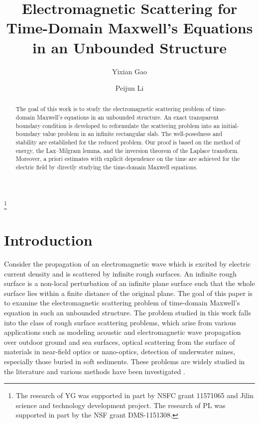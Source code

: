 \documentclass[11pt,reqno]{amsart}
\numberwithin{equation}{section}
\begin{document}
\title[Time-Domain Maxwell's Equation in an Unbounded Structure]{Electromagnetic
Scattering for Time-Domain Maxwell's Equations in an Unbounded Structure}

\author{Yixian Gao}
\address{School of Mathematics and Statistics, Center for Mathematics and
Interdisciplinary Sciences, Northeast Normal University, Changchun, Jilin 130024, P.R.China}

\author{Peijun Li}
\address{Department of Mathematics, Purdue University, West Lafayette, IN 47907,
USA.}

\thanks{The research of YG was supported in part by NSFC grant 11571065 and
Jilin science and technology development project. The research of PL was
supported in part by the NSF grant DMS-1151308.}


\begin{abstract}
The goal of this work is to study the electromagnetic scattering problem of
time-domain Maxwell's equations in an unbounded structure. An exact transparent
boundary condition is developed to reformulate the scattering problem into an
initial-boundary value problem in an infinite rectangular slab.
The well-posedness and stability are established for the reduced problem. Our
proof is based on the method of energy, the Lax--Milgram lemma, and the
inversion theorem of the Laplace transform. Moreover, a priori estimates with
explicit dependence on the time are achieved for the electric field by directly
studying the time-domain Maxwell equations.
\end{abstract}

\maketitle

\section{Introduction}

Consider the propagation of an electromagnetic wave which is excited by electric
current density and is scattered by infinite rough surfaces. An infinite rough
surface is a non-local perturbation of an infinite plane surface such that the
whole surface lies within a finite distance of the original plane. The goal of
this paper is to examine the electromagnetic scattering problem of time-domain
Maxwell's equation in such an unbounded structure. The problem studied in this
work falls into the class of rough surface scattering problems, which arise from
various applications such as modeling acoustic and electromagnetic wave
propagation over outdoor ground and sea surfaces, optical scattering from the
surface of materials in near-field optics or nano-optics, detection of
underwater mines, especially those buried in soft sediments. These problems are
widely studied in the literature and various methods have been
investigated \cite{Ogilvy1991wave, Saillard2001rigorous, Voronovich1994wave,
Warnick2001numerical, Desanto2002scattering, Elfouhaily2004critical}. 
\end{document}
